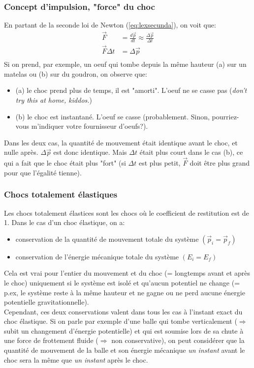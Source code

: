 \documentclass{article}
\numberwithin{equation}{section}
\begin{document}
\subsubsection{Concept d'impulsion, "force" du choc}
En partant de la seconde loi de Newton (\ref{eq:lexsecunda}), on voit que:
\begin{align*}
	\vec F 			&= \frac{d \vec p}{dt} \approx \frac{\Delta \vec p}{\Delta t} \\
	\vec F \Delta t 	&= \Delta \vec p \\
\end{align*}
Si on prend, par exemple, un oeuf qui tombe depuis la même hauteur (a) sur un matelas ou (b) sur du goudron, on observe que:
\begin{itemize}
	\item (a) le choc prend plus de temps, il est "amorti". L'oeuf ne se casse pas (\emph{don't try this at home, kiddos.})
	\item (b) le choc est instantané. L'oeuf se casse (probablement. Sinon, pourriez-vous m'indiquer votre fournisseur d'oeufs?).
\end{itemize}
Dans les deux cas, la quantité de mouvement était identique avant le choc, et nulle après. \(\Delta \vec p\) est donc identique. Mais \(\Delta t\) était plus court dans le cas (b), ce qui a fait que le choc était plus "fort" (si \(\Delta t\) est plus petit, \(\vec F\) doit être plus grand pour que l'égalité tienne).

\subsubsection{Chocs totalement élastiques}
Les chocs totalement élastices sont les chocs où le coefficient de restitution est de 1.
Dans le cas d'un choc élastique, on a:
\begin{itemize}
	\item conservation de la quantité de mouvement totale du système \((\vec p_i = \vec p_f)\)
	\item conservation de l'énergie mécanique totale du système \((E_i = E_f)\)
\end{itemize}
Cela est vrai pour l'entier du mouvement et du choc (= longtemps avant et après le choc) uniquement si le système est isolé et qu'aucun potentiel ne change (= p.ex, le système reste à la même hauteur et ne gagne ou ne perd aucune énergie potentielle gravitationnelle). \\
Cependant, ces deux conservations valent dans tous les cas à l'instant exact du choc élastique. Si on parle par exemple d'une balle qui tombe verticalement (\(\Rightarrow\) subit un changement d'énergie potentielle) et qui est soumise lors de sa chute à une force de frottement fluide (\(\Rightarrow\) non conservative), on peut considérer que la quantité de mouvement de la balle et son énergie mécanique \emph{un instant} avant le choc sera la même que \emph{un instant} après le choc. 
\end{document}

